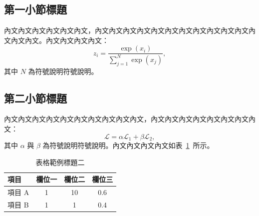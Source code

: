 \begin{ZhChapter}
\subsection{第一小節標題}

內文內文內文內文內文內文，內文內文內文內文內文內文內文內文內文內文內文內文內文內文。內文內文內文內文：
\begin{equation}
    z_i = \frac{\exp(x_i)}{\sum_{j=1}^{N}\exp(x_j)},
    \label{eq:example2}
\end{equation}
其中 $N$ 為符號說明符號說明。

\subsection{第二小節標題}

內文內文內文內文內文內文內文內文內文內文，內文內文內文內文內文內文內文內文：
\begin{equation}
    \mathcal{L} = \alpha \mathcal{L}_1 + \beta \mathcal{L}_2,
    \label{eq:example3}
\end{equation}
其中 $\alpha$ 與 $\beta$ 為符號說明符號說明。內文內文內文內文如表~\ref{tab:example2}~所示。

\begin{table}[htbp]
    \centering
    \caption{表格範例標題二}
    \label{tab:example2}
    \renewcommand\arraystretch{1.2}
    \begin{tabular}{| l | c | c | c |}
        \hline
        項目 & 欄位一 & 欄位二 & 欄位三 \\
        \hline
        項目 A & 1 & 10 & 0.6 \\
        項目 B & 1 & 1  & 0.4 \\
        \hline
    \end{tabular}
\end{table}

\end{ZhChapter}